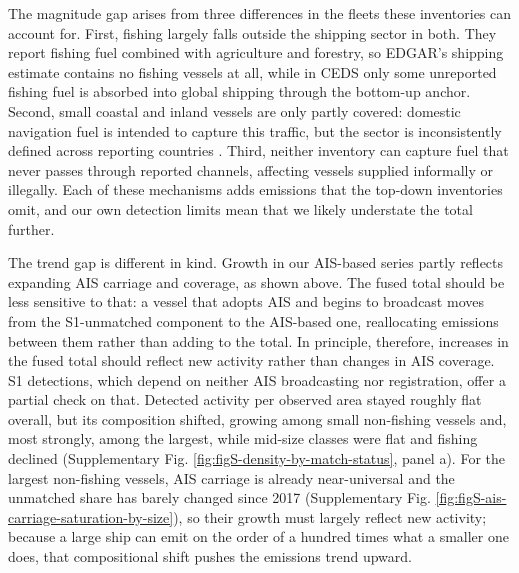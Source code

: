 
\FloatBarrier


\FloatBarrier

The magnitude gap arises from three differences in the fleets these inventories can account for. First, fishing largely falls outside the shipping sector in both. They report fishing fuel combined with agriculture and forestry, so EDGAR's shipping estimate contains no fishing vessels at all, while in CEDS only some unreported fishing fuel is absorbed into global shipping through the bottom-up anchor. Second, small coastal and inland vessels are only partly covered: domestic navigation fuel is intended to capture this traffic, but the sector is inconsistently defined across reporting countries \cite{kuenen2014tno}. Third, neither inventory can capture fuel that never passes through reported channels, affecting vessels supplied informally or illegally. Each of these mechanisms adds emissions that the top-down inventories omit, and our own detection limits mean that we likely understate the total further.

The trend gap is different in kind. Growth in our AIS-based series partly reflects expanding AIS carriage and coverage, as shown above. The fused total should be less sensitive to that: a vessel that adopts AIS and begins to broadcast moves from the S1-unmatched component to the AIS-based one, reallocating emissions between them rather than adding to the total. In principle, therefore, increases in the fused total should reflect new activity rather than changes in AIS coverage. S1 detections, which depend on neither AIS broadcasting nor registration, offer a partial check on that. Detected activity per observed area stayed roughly flat overall, but its composition shifted, growing among small non-fishing vessels and, most strongly, among the largest, while mid-size classes were flat and fishing declined (Supplementary Fig. \ref{fig:figS-density-by-match-status}, panel a). For the largest non-fishing vessels, AIS carriage is already near-universal and the unmatched share has barely changed since 2017 (Supplementary Fig. \ref{fig:figS-ais-carriage-saturation-by-size}), so their growth must largely reflect new activity; because a large ship can emit on the order of a hundred times what a smaller one does, that compositional shift pushes the emissions trend upward.

